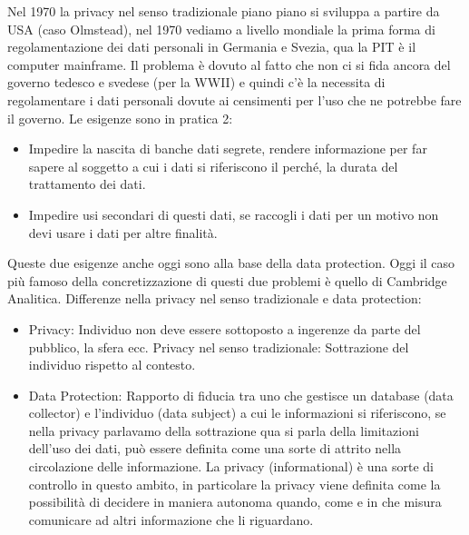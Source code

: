 \documentclass[a4page, 11pt, twocolumn]{article}
\begin{document}
Nel 1970 la privacy nel senso tradizionale piano piano si sviluppa a partire da USA (caso Olmstead), nel 1970 vediamo a livello mondiale la prima forma di regolamentazione dei dati personali in Germania e Svezia, qua la PIT è il computer mainframe. Il problema è dovuto al fatto che non ci si fida ancora del governo tedesco e svedese (per la WWII) e quindi c’è la necessita di regolamentare i dati personali dovute ai censimenti per l’uso che ne potrebbe fare il governo. Le esigenze sono in pratica 2:
\begin{itemize}
	\item Impedire la nascita di banche dati segrete, rendere informazione per far sapere al soggetto a cui i dati si riferiscono il perché, la durata del trattamento dei dati.
	\item Impedire usi secondari di questi dati, se raccogli i dati per un motivo non devi usare i dati per altre finalità.
\end{itemize}
Queste due esigenze anche oggi sono alla base della data protection. Oggi il caso più famoso della concretizzazione di questi due problemi è quello di Cambridge Analitica. \newline
Differenze nella privacy nel senso tradizionale e data protection:
\begin{itemize}
	\item Privacy: Individuo non deve essere sottoposto a ingerenze da parte del pubblico, la sfera ecc. \newline
	Privacy nel senso tradizionale: Sottrazione del individuo rispetto al contesto.
	\item Data Protection: Rapporto di fiducia tra uno che gestisce un database (data collector) e l’individuo (data subject) a cui le informazioni si riferiscono, se nella privacy parlavamo della sottrazione qua si parla della limitazioni dell’uso dei dati, può essere definita come una sorte di attrito nella circolazione delle informazione. La privacy (informational) è una sorte di controllo in questo ambito, in particolare la privacy viene definita come la possibilità di decidere in maniera autonoma quando, come e in che misura comunicare ad altri informazione che li riguardano. 
\end{itemize}
\end{document}
